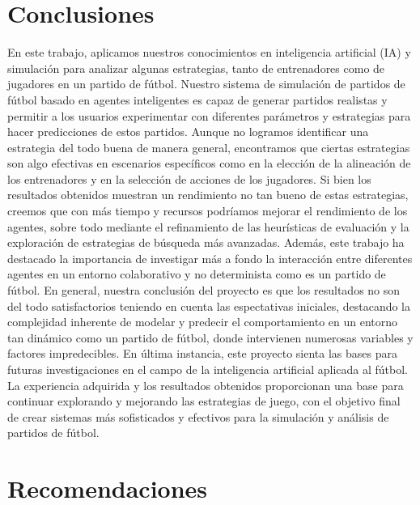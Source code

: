 \documentclass{article}
\begin{document}
\section{Conclusiones}

En este trabajo, aplicamos nuestros conocimientos en inteligencia artificial (IA) y simulación para analizar algunas estrategias, tanto de entrenadores como de jugadores en un partido de fútbol.
Nuestro sistema de simulación de partidos de fútbol basado en agentes inteligentes es capaz de generar partidos realistas y permitir a los usuarios experimentar con diferentes parámetros y estrategias para hacer predicciones de estos partidos.
Aunque no logramos identificar una estrategia del todo buena de manera general,
encontramos que ciertas estrategias son algo efectivas en escenarios específicos como en la elección de la alineación de los entrenadores y en la selección de acciones de los jugadores.
Si bien los resultados obtenidos muestran un rendimiento no tan bueno de estas estrategias, creemos que con más tiempo y recursos podríamos mejorar el rendimiento de los agentes,
sobre todo mediante el refinamiento de las heurísticas de evaluación y la exploración de estrategias de búsqueda más avanzadas. Además, este trabajo ha destacado la importancia de investigar más a fondo la interacción entre diferentes agentes en un entorno colaborativo y no determinista como es un partido de fútbol.
En general, nuestra conclusión del proyecto es que los resultados no son del todo satisfactorios teniendo en cuenta las espectativas iniciales, 
destacando la complejidad inherente de modelar y predecir el comportamiento en un entorno tan dinámico como un partido de fútbol, donde intervienen numerosas variables y factores impredecibles.
En última instancia, este proyecto sienta las bases para futuras investigaciones en el campo de la inteligencia artificial aplicada al fútbol. La experiencia adquirida y los resultados obtenidos proporcionan una base para continuar explorando y mejorando las estrategias de juego, con el objetivo final de crear sistemas más sofisticados y efectivos para la simulación y análisis de partidos de fútbol.


\section{Recomendaciones}

\end{document}
